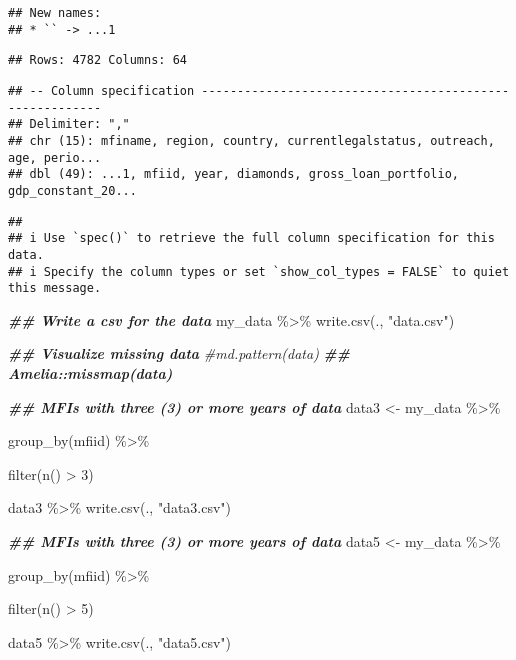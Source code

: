 \documentclass[a4paper,nobind]{templates/ociamthesis}
\newenvironment{Shaded}{\begin{snugshade}}{\end{snugshade}}
\newcommand{\CommentTok}[1]{\textcolor[rgb]{0.56,0.35,0.01}{\textit{#1}}}
\newcommand{\DecValTok}[1]{\textcolor[rgb]{0.00,0.00,0.81}{#1}}
\newcommand{\DocumentationTok}[1]{\textcolor[rgb]{0.56,0.35,0.01}{\textbf{\textit{#1}}}}
\newcommand{\FunctionTok}[1]{\textcolor[rgb]{0.00,0.00,0.00}{#1}}
\newcommand{\NormalTok}[1]{#1}
\newcommand{\OtherTok}[1]{\textcolor[rgb]{0.56,0.35,0.01}{#1}}
\newcommand{\SpecialCharTok}[1]{\textcolor[rgb]{0.00,0.00,0.00}{#1}}
\newcommand{\StringTok}[1]{\textcolor[rgb]{0.31,0.60,0.02}{#1}}
\renewenvironment{Shaded}
{
  \vspace{10pt}%
  \begin{snugshade}%
}{%
  \end{snugshade}%
  \vspace{8pt}%
}
\begin{document}
\begin{verbatim}
## New names:
## * `` -> ...1
\end{verbatim}

\begin{verbatim}
## Rows: 4782 Columns: 64
\end{verbatim}

\begin{verbatim}
## -- Column specification --------------------------------------------------------
## Delimiter: ","
## chr (15): mfiname, region, country, currentlegalstatus, outreach, age, perio...
## dbl (49): ...1, mfiid, year, diamonds, gross_loan_portfolio, gdp_constant_20...
\end{verbatim}

\begin{verbatim}
## 
## i Use `spec()` to retrieve the full column specification for this data.
## i Specify the column types or set `show_col_types = FALSE` to quiet this message.
\end{verbatim}

\begin{Shaded}
\begin{Highlighting}[]
\DocumentationTok{\#\# Write a csv for the data}
\NormalTok{my\_data }\SpecialCharTok{\%\textgreater{}\%} \FunctionTok{write.csv}\NormalTok{(., }\StringTok{"data.csv"}\NormalTok{)}

\DocumentationTok{\#\# Visualize missing data}
\CommentTok{\#md.pattern(data)}
\DocumentationTok{\#\# Amelia::missmap(data)}

\DocumentationTok{\#\# MFIs with three (3) or more years of data}
\NormalTok{data3 }\OtherTok{\textless{}{-}}\NormalTok{ my\_data }\SpecialCharTok{\%\textgreater{}\%} 
  
  \FunctionTok{group\_by}\NormalTok{(mfiid) }\SpecialCharTok{\%\textgreater{}\%} 
  
  \FunctionTok{filter}\NormalTok{(}\FunctionTok{n}\NormalTok{() }\SpecialCharTok{\textgreater{}} \DecValTok{3}\NormalTok{)}
  
\NormalTok{data3 }\SpecialCharTok{\%\textgreater{}\%} \FunctionTok{write.csv}\NormalTok{(., }\StringTok{"data3.csv"}\NormalTok{)}

\DocumentationTok{\#\# MFIs with three (3) or more years of data}
\NormalTok{data5 }\OtherTok{\textless{}{-}}\NormalTok{ my\_data }\SpecialCharTok{\%\textgreater{}\%} 
  
  \FunctionTok{group\_by}\NormalTok{(mfiid) }\SpecialCharTok{\%\textgreater{}\%} 
  
  \FunctionTok{filter}\NormalTok{(}\FunctionTok{n}\NormalTok{() }\SpecialCharTok{\textgreater{}} \DecValTok{5}\NormalTok{)  }
  
\NormalTok{data5 }\SpecialCharTok{\%\textgreater{}\%} \FunctionTok{write.csv}\NormalTok{(., }\StringTok{"data5.csv"}\NormalTok{)}
\end{Highlighting}
\end{Shaded}
\end{document}
